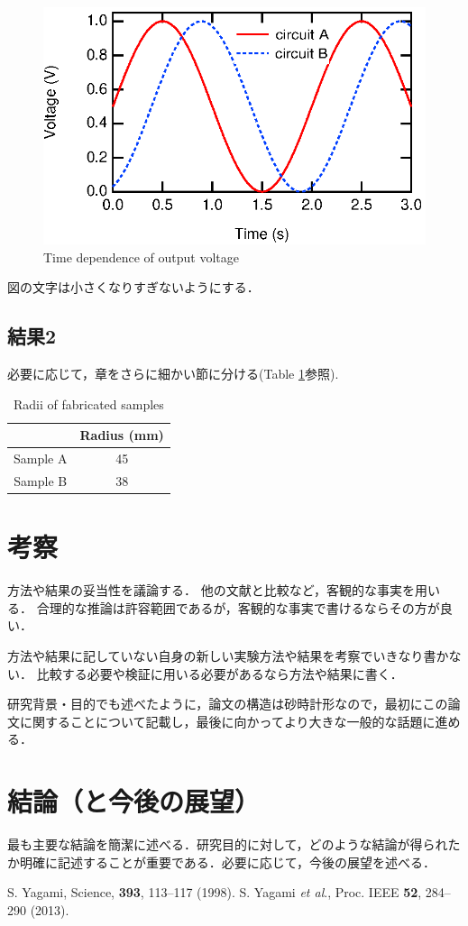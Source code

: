 \documentclass[twocolumn]{jsarticle}
\begin{document}
\begin{figure}[!htbp]
\centering
\includegraphics[width=0.9\columnwidth]{voltage.eps}
\caption{Time dependence of output voltage}
\label{fig:voltage}
\end{figure}

図の文字は小さくなりすぎないようにする．

\subsection{結果2}
必要に応じて，章をさらに細かい節に分ける(Table \ref{tbl:radii}参照).
\begin{table}[!htbp]
\centering
\caption{Radii of fabricated samples}
\label{tbl:radii}
\begin{tabular}{c|c}
\hline
& Radius (mm) \\
\hline
Sample A & 45 \\
Sample B & 38 \\
\hline
\end{tabular}
\end{table}

\section{考察}
方法や結果の妥当性を議論する．
他の文献と比較など，客観的な事実を用いる．
合理的な推論は許容範囲であるが，客観的な事実で書けるならその方が良い．

方法や結果に記していない自身の新しい実験方法や結果を考察でいきなり書かない．
比較する必要や検証に用いる必要があるなら方法や結果に書く．

研究背景・目的でも述べたように，論文の構造は砂時計形なので，最初にこの論文に関することについて記載し，最後に向かってより大きな一般的な話題に進める．


\section{結論（と今後の展望）}
最も主要な結論を簡潔に述べる．研究目的に対して，どのような結論が得られたか明確に記述することが重要である．必要に応じて，今後の展望を述べる．

\begin{thebibliography}{9}
 S. Yagami, Science, \textbf{393}, 113--117 (1998).
 S. Yagami \textit{et al}., Proc. IEEE \textbf{52}, 284--290 (2013).
\end{thebibliography}
\end{document}
